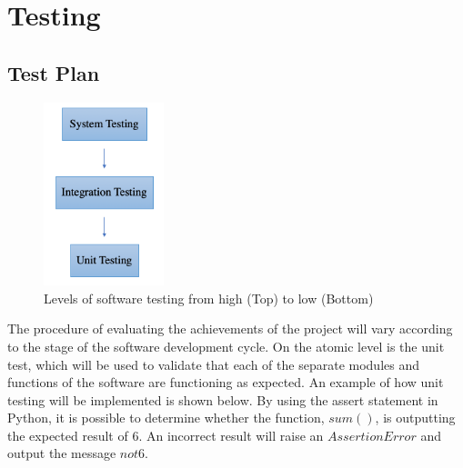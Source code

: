 \documentclass[10pt,onecolumn,letterpaper]{article}
\begin{document}
\newpage

\section{Testing}

\subsection{Test Plan} 

\begin{figure}[!hbt!]
\centering
\includegraphics[width=3.5cm]{evaluation.png}
\caption{Levels of software testing from high (Top) to low (Bottom)}
\end{figure}

The procedure of evaluating the achievements of the project will vary according to the stage of the software development cycle. On the atomic level is the unit test, which will be used to validate that each of the separate modules and functions of the software are functioning as expected. An example\cite{python_testing} of how unit testing will be implemented is shown below. By using the assert statement in Python, it is possible to determine whether the function, $sum()$, is outputting the expected result of $6$. An incorrect result will raise an $AssertionError$ and output the message $not6$.
\end{document}
